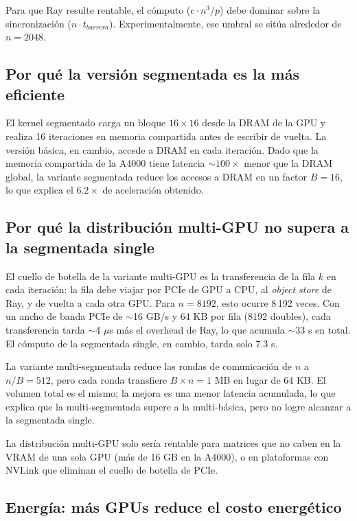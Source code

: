 \documentclass[conference]{IEEEtran}
\begin{document}
Para que Ray resulte rentable, el cómputo ($c \cdot n^3/p$) debe
dominar sobre la sincronización ($n \cdot t_{barrera}$). Experimentalmente,
ese umbral se sitúa alrededor de $n = 2048$.

\subsection{Por qué la versión segmentada es la más eficiente}

El kernel segmentado carga un bloque $16 \times 16$ desde la DRAM de la
GPU y realiza 16 iteraciones en memoria compartida antes de escribir de
vuelta. La versión básica, en cambio, accede a DRAM en cada iteración.
Dado que la memoria compartida de la A4000 tiene latencia $\sim100\times$
menor que la DRAM global, la variante segmentada reduce los accesos a
DRAM en un factor $B=16$, lo que explica el $6.2\times$ de aceleración
obtenido.

\subsection{Por qué la distribución multi-GPU no supera a la segmentada single}

El cuello de botella de la variante multi-GPU es la transferencia de la
fila $k$ en cada iteración: la fila debe viajar por PCIe de GPU a CPU,
al \textit{object store} de Ray, y de vuelta a cada otra GPU. Para
$n=8192$, esto ocurre 8\,192 veces. Con un ancho de banda PCIe de
$\sim$16 GB/s y 64 KB por fila (8192 doubles), cada transferencia tarda
$\sim$4 $\mu$s más el overhead de Ray, lo que acumula $\sim$33 s en
total. El cómputo de la segmentada single, en cambio, tarda solo 7.3 s.

La variante multi-segmentada reduce las rondas de comunicación de $n$ a
$n/B=512$, pero cada ronda transfiere $B \times n = 1$ MB en lugar de
64 KB. El volumen total es el mismo; la mejora es una menor latencia
acumulada, lo que explica que la multi-segmentada supere a la
multi-básica, pero no logre alcanzar a la segmentada single.

La distribución multi-GPU solo sería rentable para matrices que no caben
en la VRAM de una sola GPU (más de 16 GB en la A4000), o en plataformas
con NVLink que eliminan el cuello de botella de PCIe.

\subsection{Energía: más GPUs reduce el costo energético}
\end{document}
